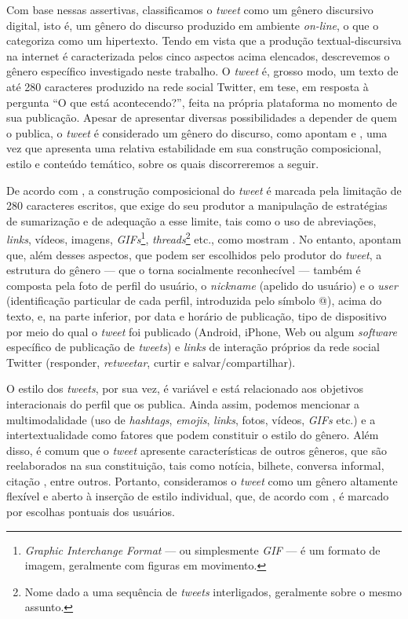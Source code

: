 \documentclass{textolivre}
\begin{document}
Com base nessas assertivas, classificamos o \textit{tweet} como um gênero discursivo digital, isto é, um gênero do discurso produzido em ambiente \textit{on-line}, o que o categoriza como um hipertexto. Tendo em vista que a produção textual-discursiva na internet é caracterizada pelos cinco aspectos acima elencados, descrevemos o gênero específico investigado neste trabalho. O \textit{tweet} é, grosso modo, um texto de até 280 caracteres produzido na rede social Twitter, em tese, em resposta à pergunta “O que está acontecendo?”, feita na própria plataforma no momento de sua publicação. Apesar de apresentar diversas possibilidades a depender de quem o publica, o \textit{tweet} é considerado um gênero do discurso, como apontam \textcite{freitas_genero_2015} e \textcite{azevedo_o_2021}, uma vez que apresenta uma relativa estabilidade em sua construção composicional, estilo e conteúdo temático, sobre os quais discorreremos a seguir.

De acordo com \textcite{azevedo_o_2021}, a construção composicional do \textit{tweet} é marcada pela limitação de 280 caracteres escritos, que exige do seu produtor a manipulação de estratégias de sumarização e de adequação a esse limite, tais como o uso de abreviações, \textit{links}, vídeos, imagens, \textit{GIFs}\footnote{\textit{Graphic Interchange Format} — ou simplesmente \textit{GIF} — é um formato de imagem, geralmente com figuras em movimento.}, \textit{threads}\footnote{Nome dado a uma sequência de \textit{tweets} interligados, geralmente sobre o mesmo assunto.} etc., como mostram \textcite{azevedo_estrategias_2020}. No entanto, \textcite{azevedo_o_2021} apontam que, além desses aspectos, que podem ser escolhidos pelo produtor do \textit{tweet}, a estrutura do gênero — que o torna socialmente reconhecível — também é composta pela foto de perfil do usuário, o \textit{nickname} (apelido do usuário) e o \textit{user} (identificação particular de cada perfil, introduzida pelo símbolo @), acima do texto, e, na parte inferior, por data e horário de publicação, tipo de dispositivo por meio do qual o \textit{tweet} foi publicado (Android, iPhone, Web ou algum \textit{software} específico de publicação de \textit{tweets}) e \textit{links} de interação próprios da rede social Twitter (responder, \textit{retweetar}, curtir e salvar/compartilhar).

O estilo dos \textit{tweets}, por sua vez, é variável e está relacionado aos objetivos interacionais do perfil que os publica. Ainda assim, podemos mencionar a multimodalidade (uso de \textit{hashtags}, \textit{emojis}, \textit{links}, fotos, vídeos, \textit{GIFs} etc.) e a intertextualidade \cite{barth_letramento_2014} como fatores que podem constituir o estilo do gênero. Além disso, é comum que o \textit{tweet} apresente características de outros gêneros, que são reelaborados na sua constituição, tais como notícia, bilhete, conversa informal, citação \cite{freitas_genero_2015}, entre outros. Portanto, consideramos o \textit{tweet} como um gênero altamente flexível e aberto à inserção de estilo individual, que, de acordo com \textcite{barth_letramento_2014}, é marcado por escolhas pontuais dos usuários.
\end{document}
